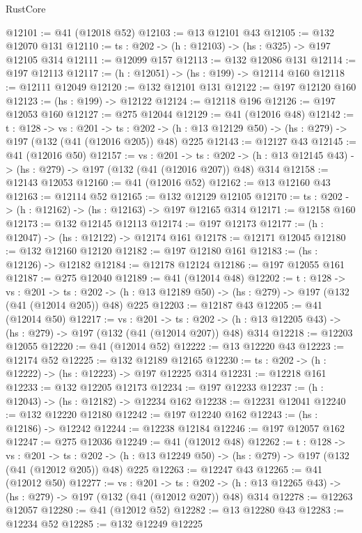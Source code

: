 \begin{lexlean}{RustCore}
\begin{coremodule}
@12101 := @41 (@12018 @52)
@12103 := @13 @12101 @43
@12105 := @132 @12070 @131
@12110 := {ts : @202} -> (h : @12103) -> (hs : @325) -> @197 @12105 @314
@12111 := @12099 @157
@12113 := @132 @12086 @131
@12114 := @197 @12113
@12117 := (h : @12051) -> (hs : @199) -> @12114 @160
@12118 := @12111 @12049
@12120 := @132 @12101 @131
@12122 := @197 @12120 @160
@12123 := (hs : @199) -> @12122
@12124 := @12118 @196
@12126 := @197 @12053 @160
@12127 := @275 @12044
@12129 := @41 (@12016 @48)
@12142 := {t : @128} ->
  {vs : @201} ->
  {ts : @202} -> (h : @13 @12129 @50) -> (hs : @279) -> @197 (@132 (@41 (@12016 @205)) @48) @225
@12143 := @12127 @43
@12145 := @41 (@12016 @50)
@12157 := {vs : @201} ->
  {ts : @202} -> (h : @13 @12145 @43) -> (hs : @279) -> @197 (@132 (@41 (@12016 @207)) @48) @314
@12158 := @12143 @12053
@12160 := @41 (@12016 @52)
@12162 := @13 @12160 @43
@12163 := @12114 @52
@12165 := @132 @12129 @12105
@12170 := {ts : @202} -> (h : @12162) -> (hs : @12163) -> @197 @12165 @314
@12171 := @12158 @160
@12173 := @132 @12145 @12113
@12174 := @197 @12173
@12177 := (h : @12047) -> (hs : @12122) -> @12174 @161
@12178 := @12171 @12045
@12180 := @132 @12160 @12120
@12182 := @197 @12180 @161
@12183 := (hs : @12126) -> @12182
@12184 := @12178 @12124
@12186 := @197 @12055 @161
@12187 := @275 @12040
@12189 := @41 (@12014 @48)
@12202 := {t : @128} ->
  {vs : @201} ->
  {ts : @202} -> (h : @13 @12189 @50) -> (hs : @279) -> @197 (@132 (@41 (@12014 @205)) @48) @225
@12203 := @12187 @43
@12205 := @41 (@12014 @50)
@12217 := {vs : @201} ->
  {ts : @202} -> (h : @13 @12205 @43) -> (hs : @279) -> @197 (@132 (@41 (@12014 @207)) @48) @314
@12218 := @12203 @12055
@12220 := @41 (@12014 @52)
@12222 := @13 @12220 @43
@12223 := @12174 @52
@12225 := @132 @12189 @12165
@12230 := {ts : @202} -> (h : @12222) -> (hs : @12223) -> @197 @12225 @314
@12231 := @12218 @161
@12233 := @132 @12205 @12173
@12234 := @197 @12233
@12237 := (h : @12043) -> (hs : @12182) -> @12234 @162
@12238 := @12231 @12041
@12240 := @132 @12220 @12180
@12242 := @197 @12240 @162
@12243 := (hs : @12186) -> @12242
@12244 := @12238 @12184
@12246 := @197 @12057 @162
@12247 := @275 @12036
@12249 := @41 (@12012 @48)
@12262 := {t : @128} ->
  {vs : @201} ->
  {ts : @202} -> (h : @13 @12249 @50) -> (hs : @279) -> @197 (@132 (@41 (@12012 @205)) @48) @225
@12263 := @12247 @43
@12265 := @41 (@12012 @50)
@12277 := {vs : @201} ->
  {ts : @202} -> (h : @13 @12265 @43) -> (hs : @279) -> @197 (@132 (@41 (@12012 @207)) @48) @314
@12278 := @12263 @12057
@12280 := @41 (@12012 @52)
@12282 := @13 @12280 @43
@12283 := @12234 @52
@12285 := @132 @12249 @12225

\end{coremodule}
\end{lexlean}
